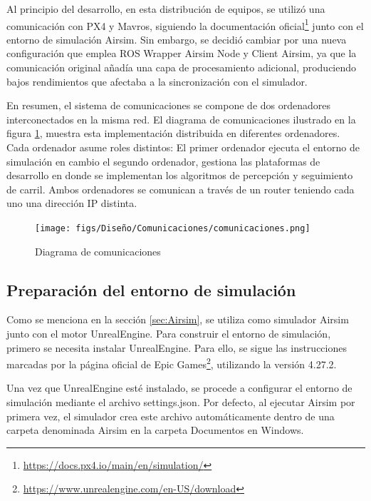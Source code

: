 Al principio del desarrollo, en esta distribución de equipos, se utilizó una comunicación con PX4 y Mavros, siguiendo la documentación oficial\footnote{\url{https://docs.px4.io/main/en/simulation/}} 
junto con el entorno de simulación Airsim. Sin embargo, se decidió cambiar por una nueva configuración que emplea ROS Wrapper Airsim Node y Client Airsim, ya que 
la comunicación original añadía una capa de procesamiento adicional, produciendo bajos rendimientos que afectaba a la sincronización con el simulador. 

En resumen, el sistema de comunicaciones se compone de dos ordenadores interconectados en la misma red. El diagrama 
de comunicaciones ilustrado en la figura \ref{fig:diagramadeAirsim}, muestra esta implementación distribuida en diferentes ordenadores. Cada ordenador asume roles distintos: 
El primer ordenador ejecuta el entorno de simulación en cambio el segundo ordenador, gestiona las plataformas de desarrollo en donde se implementan los algoritmos 
de percepción y seguimiento de carril. Ambos ordenadores se comunican a través de un router teniendo cada uno una dirección IP distinta. 

\begin{figure} [H]
  \begin{center}
    \texttt{[image: figs/Diseño/Comunicaciones/comunicaciones.png]}
  \end{center}
  \caption{Diagrama de comunicaciones}
  \label{fig:diagramadeAirsim}
\end{figure}

\subsection{Preparación del entorno de simulación}
\label{sec:Preparación_entorno}

Como se menciona en la sección \ref{sec:Airsim}, se utiliza como simulador Airsim junto con el motor UnrealEngine. Para construir el entorno de simulación, primero
se necesita instalar UnrealEngine. Para ello, se sigue las instrucciones marcadas por la página oficial de Epic Games\footnote{\url{https://www.unrealengine.com/en-US/download}}, 
utilizando la versión 4.27.2.

Una vez que UnrealEngine esté instalado, se procede a configurar el entorno de simulación mediante el archivo settings.json. Por defecto, al ejecutar Airsim 
por primera vez, el simulador crea este archivo automáticamente dentro de una carpeta denominada Airsim en la carpeta Documentos en Windows. 


